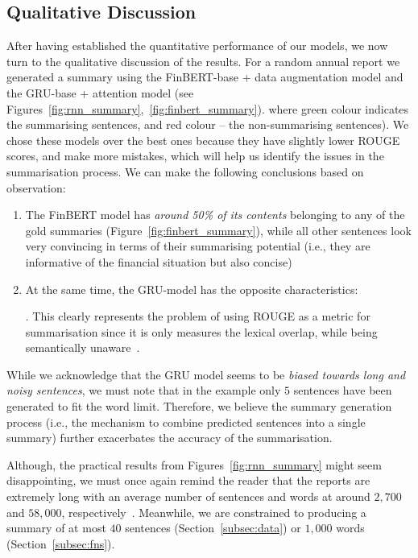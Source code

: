 \subsection{Qualitative Discussion}\label{subsec:qualitative-discussion}
After having established the quantitative performance of our models, we now turn to the qualitative discussion of the results.
For a random annual report we generated a summary using the FinBERT-base + data augmentation model and
the GRU-base + attention model (see Figures~\ref{fig:rnn_summary},~\ref{fig:finbert_summary}).
where green colour indicates the summarising sentences, and red colour -- the non-summarising sentences).
We chose these models over the best ones because they have slightly lower ROUGE scores, and make more mistakes, which will help us identify the issues in the summarisation process.
We can make the following conclusions based on observation:
\begin{enumerate}
    \item The FinBERT model has \emph{around 50\% of its contents} belonging to any of the gold summaries (Figure~\ref{fig:finbert_summary}),
        while all other sentences look very convincing in terms of their summarising potential (i.e., they are informative of the financial situation but also concise)
    \item At the same time, the GRU-model has the opposite characteristics:
    .
    This clearly represents the problem of using ROUGE as a metric for summarisation since it is only measures the lexical overlap, while being semantically unaware~\cite{akter-etal-2022-revisiting}.
\end{enumerate}
While we acknowledge that the GRU model seems to be \emph{biased towards long and noisy sentences}, we must note that in the example
only $5$ sentences have been generated to fit the word limit.
Therefore, we believe the summary generation process (i.e., the mechanism to combine predicted sentences into a single summary) further
exacerbates the accuracy of the summarisation.

Although, the practical results from Figures~\ref{fig:rnn_summary} might seem disappointing, we must once again remind the reader that the reports are extremely
long with an average number of sentences and words at around $2,700$ and $58,000$, respectively~\cite{litvak-vanetik-2021-summarization}.
Meanwhile, we are constrained to producing a summary of at most $40$ sentences (Section~\ref{subsec:data}) or $1,000$ words (Section~\ref{subsec:fns}).

